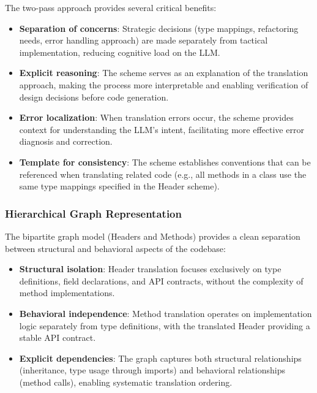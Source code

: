 The two-pass approach provides several critical benefits:

\begin{itemize}
\item \textbf{Separation of concerns}: Strategic decisions (type mappings, refactoring needs, error handling approach) are made separately from tactical implementation, reducing cognitive load on the LLM.

\item \textbf{Explicit reasoning}: The scheme serves as an explanation of the translation approach, making the process more interpretable and enabling verification of design decisions before code generation.

\item \textbf{Error localization}: When translation errors occur, the scheme provides context for understanding the LLM's intent, facilitating more effective error diagnosis and correction.

\item \textbf{Template for consistency}: The scheme establishes conventions that can be referenced when translating related code (e.g., all methods in a class use the same type mappings specified in the Header scheme).
\end{itemize}

\subsubsection{Hierarchical Graph Representation}

The bipartite graph model (Headers and Methods) provides a clean separation between structural and behavioral aspects of the codebase:

\begin{itemize}
\item \textbf{Structural isolation}: Header translation focuses exclusively on type definitions, field declarations, and API contracts, without the complexity of method implementations.

\item \textbf{Behavioral independence}: Method translation operates on implementation logic separately from type definitions, with the translated Header providing a stable API contract.

\item \textbf{Explicit dependencies}: The graph captures both structural relationships (inheritance, type usage through imports) and behavioral relationships (method calls), enabling systematic translation ordering.
\end{itemize}

